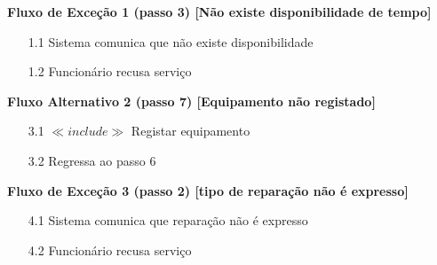 \documentclass[../relatorio.tex]{subfiles}
\begin{document}
\begin{itemize}
          \begin{flushleft}
              \textbf{Fluxo de Exceção 1 (passo 3) [Não existe disponibilidade de tempo]}
          \end{flushleft}
          \begin{itemize}
              \item[1.1]{Sistema comunica que não existe disponibilidade}
              \item[1.2]{Funcionário recusa serviço}
          \end{itemize}
          \begin{flushleft}
              \textbf{Fluxo Alternativo 2 (passo 7) [Equipamento não registado]}
          \end{flushleft}
          \begin{itemize}
              \item[3.1] $\ll include \gg$ Registar equipamento
              \item[3.2] Regressa ao passo 6
          \end{itemize}
          \begin{flushleft}
              \textbf{Fluxo de Exceção 3 (passo 2) [tipo de reparação não é expresso]}
          \end{flushleft}
          \begin{itemize}
              \item[4.1]{Sistema comunica que reparação não é expresso}
              \item[4.2]{Funcionário recusa serviço}
          \end{itemize}
\end{itemize}
\end{document}
